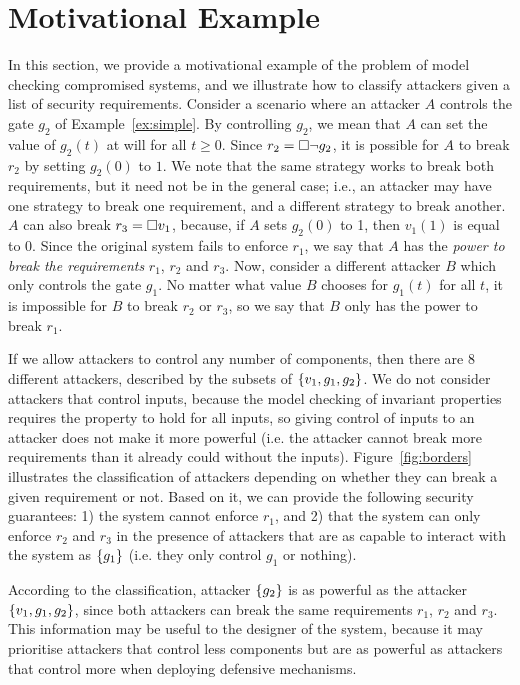 {\section{Motivational Example}
\label{sec:Example}
In this section, we provide a motivational example of the problem of model checking compromised systems, and we illustrate how to classify attackers given a list of security requirements. Consider a scenario where an attacker $A$ controls the gate $g_2$ of Example~\ref{ex:simple}. By controlling $g_2$, we mean that $A$ can set the value of $g_2(t)$ at will for all $t\geq 0$. Since $r_2={{\square}} \lnot g_2$, it is possible for $A$ to break $r_2$ by setting $g_2(0)$ to $1$. We note that the same strategy works to break both requirements, but it need not be in the general case; i.e., an attacker may have one strategy to break one requirement, and a different strategy to break another. $A$ can also break $r_3={{\square}} v_1$, because, if $A$ sets $g_2(0)$ to 1, then $v_1(1)$ is equal to $0$. Since the original system fails to enforce $r_1$, we say that $A$ has the \emph{power to break the requirements} $r_1$, $r_2$ and $r_3$. Now, consider a different attacker $B$ which only controls the gate $g_1$. No matter what value $B$ chooses for $g_1(t)$ for all $t$, it is impossible for $B$ to break $r_2$ or $r_3$, so we say that $B$ only has the power to break $r_1$. 

If we allow attackers to control any number of components, then there are $8$ different attackers, described by the subsets of $\left\{v_1,g_1,g_2\right\}$. We do not consider attackers that control inputs, because the model checking of invariant properties requires the property to hold for all inputs, so giving control of inputs to an attacker does not make it more powerful (i.e. the attacker cannot break more requirements than it already could without the inputs). Figure~\ref{fig:borders} illustrates the classification of attackers depending on whether they can break a given requirement or not. Based on it, we can provide the following security guarantees: 1) the system cannot enforce $r_1$, and 2) that the system can only enforce $r_2$ and $r_3$ in the presence of attackers that are as capable to interact with the system as $\left\{g_1\right\}$ (i.e. they only control $g_1$ or nothing).

According to the classification, attacker $\left\{g_2\right\}$ is as powerful as the attacker $\left\{v_1,g_1,g_2\right\}$, since both attackers can break the same requirements $r_1$, $r_2$ and $r_3$. This information may be useful to the designer of the system, because it may prioritise attackers that control less components but are as powerful as attackers that control more when deploying defensive mechanisms.

}
